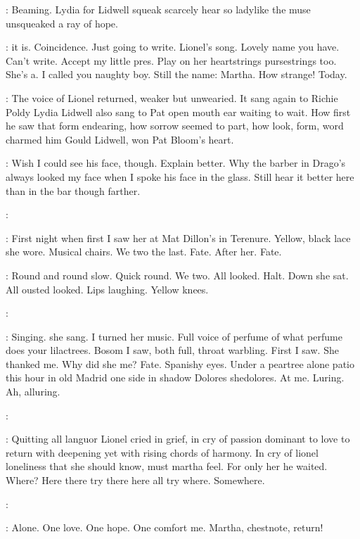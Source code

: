 :
Beaming.
Lydia for Lidwell squeak scarcely hear so ladylike the muse unsqueaked a ray of hope.

\BloomInt:
 it is.
Coincidence.
Just going to write.
Lionel's song.
Lovely
name you have.
Can't write.
Accept my little pres.
Play on her
heartstrings pursestrings too.
She's a.
I called you naughty boy.
Still
the name:
Martha.
How strange!
Today.

:
The voice of Lionel returned,
weaker but unwearied.
It sang again to
Richie Poldy Lydia Lidwell also sang to Pat open mouth ear waiting to
wait.
How first he saw that form endearing,
how sorrow seemed to part,
how look,
form,
word charmed him
Gould Lidwell,
won Pat Bloom's heart.

\BloomInt:
Wish I could see his face,
though.
Explain better.
Why the barber in
Drago's always looked my face when I spoke his face in the glass.
Still
hear it better here than in the bar though farther.

\simon:

\BloomInt:
First night when first I saw her at Mat Dillon's in Terenure.
Yellow,
black lace she wore.
Musical chairs.
We two the last.
Fate.
After her.
Fate.

\BloomInt:
Round and round slow.
Quick round.
We two.
All looked.
Halt.
Down she
sat.
All ousted looked.
Lips laughing.
Yellow knees.

\simon:

\BloomInt:
Singing.
 she sang.
I turned her music.
Full voice of perfume
of what perfume does your lilactrees.
Bosom I saw,
both full,
throat
warbling.
First I saw.
She thanked me.
Why did she me?
Fate.
Spanishy
eyes.
Under a peartree alone patio this hour in old Madrid one side in
shadow Dolores shedolores.
At me.
Luring.
Ah,
alluring.

\simon:

\BloomInt:
Quitting all languor Lionel cried in grief,
in cry of passion dominant
to love to return with deepening yet with rising chords of harmony.
In cry
of lionel loneliness that she should know,
must martha feel.
For only her
he waited.
Where?
Here there try there here all try where.
Somewhere.

\simon:

\BloomInt:
Alone.
One love.
One hope.
One comfort me.
Martha,
chestnote,
return!

